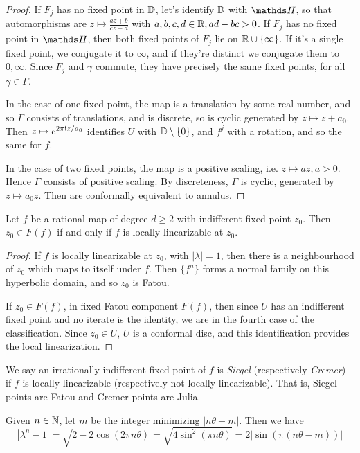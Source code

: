 \documentclass[10pt,a4paper]{article}
\begin{document}
\begin{proof}
  If $F_j$ has no fixed point in $\mathbb{D}$, let's identify $\mathbb{D}$ with $\H$, so that automorphisms are $z \mapsto \frac{az+b}{cz+d}$ with $a,b,c,d \in \mathbb{R}, ad-bc > 0$. If $F_j$ has no fixed point in $\H$, then both fixed points of $F_j$ lie on $\mathbb{R}\cup \{\infty\}$. If it's a single fixed point, we conjugate it to $\infty$, and if they're distinct we conjugate them to $0, \infty$. Since $F_j$ and $\gamma$ commute, they have precisely the same fixed points, for all $\gamma \in \Gamma$.

  In the case of one fixed point, the map is a translation by some real number, and so $\Gamma$ consists of translations, and is discrete, so is cyclic generated by $z \mapsto z+a_0$. Then $z\mapsto e^{2\pi\mathfrak{i} z/a_0}$ identifies $U$ with $\mathbb{D}\setminus\{0\}$, and $f^j$ with a rotation, and so the same for $f$.

  In the case of two fixed points, the map is a positive scaling, i.e. $z \mapsto az, a>0$. Hence $\Gamma$ consists of positive scaling. By discreteness, $\Gamma$ is cyclic, generated by $z\mapsto a_0z$. Then are conformally equivalent to annulus.
\end{proof}
\begin{corollary}
  Let $f$ be a rational map of degree $d\geq 2$ with indifferent fixed point $z_0$. Then $z_0 \in F(f)$ if and only if $f$ is locally linearizable at $z_0$.
\end{corollary}
\begin{proof}
  If $f$ is locally linearizable at $z_0$, with $|\lambda| = 1$, then there is a neighbourhood of $z_0$ which maps to itself under $f$. Then $\{f^n\}$ forms a normal family on this hyperbolic domain, and so $z_0$ is Fatou.

  If $z_0 \in F(f)$, in fixed Fatou component $F(f)$, then since $U$ has an indifferent fixed point and no iterate is the identity, we are in the fourth case of the classification. Since $z_0 \in U$, $U$ is a conformal disc, and this identification provides the local linearization.
\end{proof}
\begin{definition}
  We say an irrationally indifferent fixed point of $f$ is \emph{Siegel} (respectively \emph{Cremer}) if $f$ is locally linearizable (respectively not locally linearizable). That is, Siegel points are Fatou and Cremer points are Julia.
\end{definition}
Given $n \in \mathbb{N}$, let $m$ be the integer minimizing $|n\theta - m|$. Then we have
\[|\lambda^n-1|=\sqrt{2-2\cos(2\pi n\theta)} = \sqrt{4\sin^2(\pi n \theta)} = 2|\sin(\pi(n\theta - m))|\]
\end{document}
